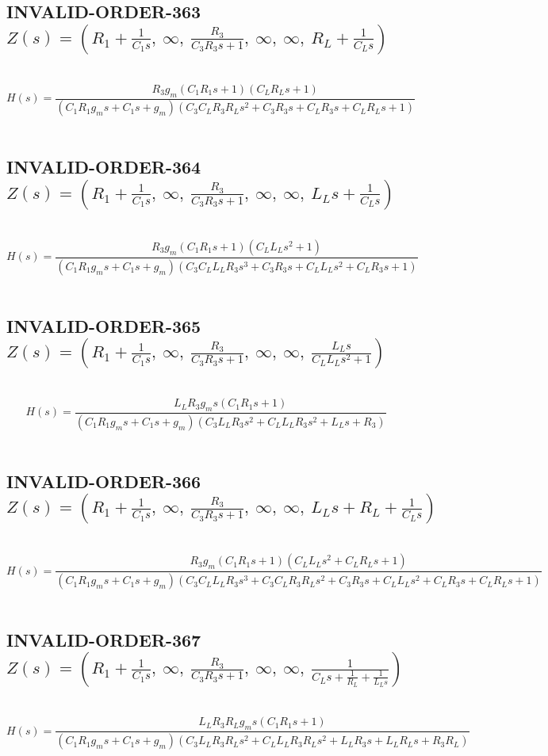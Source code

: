 \documentclass{article}
\begin{document}
\subsection{INVALID-ORDER-363 $Z(s) = \left( R_{1} + \frac{1}{C_{1} s}, \  \infty, \  \frac{R_{3}}{C_{3} R_{3} s + 1}, \  \infty, \  \infty, \  R_{L} + \frac{1}{C_{L} s}\right)$ } \ 
\textbf{\[H(s) = \frac{R_{3} g_{m} \left(C_{1} R_{1} s + 1\right) \left(C_{L} R_{L} s + 1\right)}{\left(C_{1} R_{1} g_{m} s + C_{1} s + g_{m}\right) \left(C_{3} C_{L} R_{3} R_{L} s^{2} + C_{3} R_{3} s + C_{L} R_{3} s + C_{L} R_{L} s + 1\right)}\] } \ 
\subsection{INVALID-ORDER-364 $Z(s) = \left( R_{1} + \frac{1}{C_{1} s}, \  \infty, \  \frac{R_{3}}{C_{3} R_{3} s + 1}, \  \infty, \  \infty, \  L_{L} s + \frac{1}{C_{L} s}\right)$ } \ 
\textbf{\[H(s) = \frac{R_{3} g_{m} \left(C_{1} R_{1} s + 1\right) \left(C_{L} L_{L} s^{2} + 1\right)}{\left(C_{1} R_{1} g_{m} s + C_{1} s + g_{m}\right) \left(C_{3} C_{L} L_{L} R_{3} s^{3} + C_{3} R_{3} s + C_{L} L_{L} s^{2} + C_{L} R_{3} s + 1\right)}\] } \ 
\subsection{INVALID-ORDER-365 $Z(s) = \left( R_{1} + \frac{1}{C_{1} s}, \  \infty, \  \frac{R_{3}}{C_{3} R_{3} s + 1}, \  \infty, \  \infty, \  \frac{L_{L} s}{C_{L} L_{L} s^{2} + 1}\right)$ } \ 
\textbf{\[H(s) = \frac{L_{L} R_{3} g_{m} s \left(C_{1} R_{1} s + 1\right)}{\left(C_{1} R_{1} g_{m} s + C_{1} s + g_{m}\right) \left(C_{3} L_{L} R_{3} s^{2} + C_{L} L_{L} R_{3} s^{2} + L_{L} s + R_{3}\right)}\] } \ 
\subsection{INVALID-ORDER-366 $Z(s) = \left( R_{1} + \frac{1}{C_{1} s}, \  \infty, \  \frac{R_{3}}{C_{3} R_{3} s + 1}, \  \infty, \  \infty, \  L_{L} s + R_{L} + \frac{1}{C_{L} s}\right)$ } \ 
\textbf{\[H(s) = \frac{R_{3} g_{m} \left(C_{1} R_{1} s + 1\right) \left(C_{L} L_{L} s^{2} + C_{L} R_{L} s + 1\right)}{\left(C_{1} R_{1} g_{m} s + C_{1} s + g_{m}\right) \left(C_{3} C_{L} L_{L} R_{3} s^{3} + C_{3} C_{L} R_{3} R_{L} s^{2} + C_{3} R_{3} s + C_{L} L_{L} s^{2} + C_{L} R_{3} s + C_{L} R_{L} s + 1\right)}\] } \ 
\subsection{INVALID-ORDER-367 $Z(s) = \left( R_{1} + \frac{1}{C_{1} s}, \  \infty, \  \frac{R_{3}}{C_{3} R_{3} s + 1}, \  \infty, \  \infty, \  \frac{1}{C_{L} s + \frac{1}{R_{L}} + \frac{1}{L_{L} s}}\right)$ } \ 
\textbf{\[H(s) = \frac{L_{L} R_{3} R_{L} g_{m} s \left(C_{1} R_{1} s + 1\right)}{\left(C_{1} R_{1} g_{m} s + C_{1} s + g_{m}\right) \left(C_{3} L_{L} R_{3} R_{L} s^{2} + C_{L} L_{L} R_{3} R_{L} s^{2} + L_{L} R_{3} s + L_{L} R_{L} s + R_{3} R_{L}\right)}\] } \ 
\end{document}
